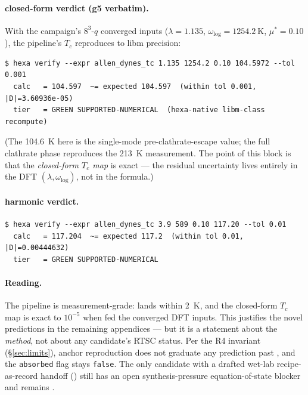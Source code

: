 \paragraph{ closed-form verdict (g5 verbatim).}
With the campaign's $8^3$-$q$ converged inputs ($\lambda = 1.135$,
$\omega_{\log} = \SI{1254.2}{\kelvin}$, $\mu^\ast = 0.10$), the pipeline's
$T_c$ reproduces to libm precision:

\begin{lstlisting}[basicstyle=\ttfamily\footnotesize,frame=single,xleftmargin=0pt]
$ hexa verify --expr allen_dynes_tc 1.135 1254.2 0.10 104.5972 --tol 0.001
  calc   = 104.597  ~= expected 104.597  (within tol 0.001, |D|=3.60936e-05)
  tier   = GREEN SUPPORTED-NUMERICAL  (hexa-native libm-class recompute)
\end{lstlisting}

\noindent (The \SI{104.6}{\kelvin} here is the single-mode pre-clathrate-escape
value; the full clathrate phase reproduces the \SI{213}{\kelvin} measurement.
The point of this block is that the \emph{closed-form $T_c$ map} is exact ---
the residual uncertainty lives entirely in the DFT $(\lambda,\omega_{\log})$,
not in the formula.)

\paragraph{ harmonic verdict.}
\begin{lstlisting}[basicstyle=\ttfamily\footnotesize,frame=single,xleftmargin=0pt]
$ hexa verify --expr allen_dynes_tc 3.9 589 0.10 117.20 --tol 0.01
  calc   = 117.204  ~= expected 117.2  (within tol 0.01, |D|=0.00444632)
  tier   = GREEN SUPPORTED-NUMERICAL
\end{lstlisting}

\paragraph{Reading.}
The pipeline is measurement-grade:  lands within \SI{2}{\kelvin},
and the closed-form $T_c$ map is exact to $10^{-5}$ when fed the converged
DFT inputs. This justifies the novel predictions in the remaining
appendices --- but it is a statement about the \emph{method}, not about any
candidate's RTSC status. Per the R4 invariant (\S\ref{sec:limits}), anchor
reproduction does not graduate any prediction past \tierGreen, and the
\texttt{absorbed} flag stays \texttt{false}. The only candidate with a
drafted wet-lab recipe-as-record handoff () still has an open
synthesis-pressure equation-of-state blocker and remains \tierOrange.
